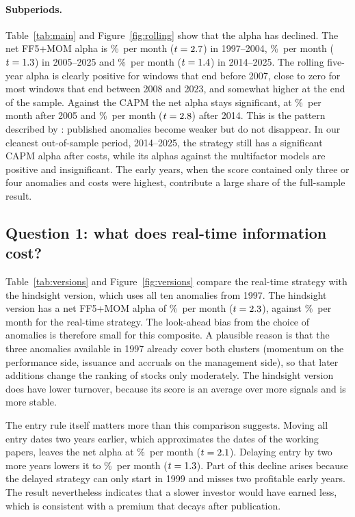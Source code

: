 \documentclass[12pt,a4paper]{article}
\newcommand{\pmo}{\%~per month}
\begin{document}
\paragraph{Subperiods.} Table~\ref{tab:main} and Figure~\ref{fig:rolling} show that the alpha has declined. The net FF5+MOM alpha is \netearlya\pmo{} ($t=2.7$) in 1997--2004, \netlatea\pmo{} ($t=1.3$) in 2005--2025 and \netrecenta\pmo{} ($t=1.4$) in 2014--2025. The rolling five-year alpha is clearly positive for windows that end before 2007, close to zero for most windows that end between 2008 and 2023, and somewhat higher at the end of the sample. Against the CAPM the net alpha stays significant, at \netlatecapm\pmo{} after 2005 and \netrecentcapm\pmo{} ($t=2.8$) after 2014. This is the pattern described by \citet{mclean2016}: published anomalies become weaker but do not disappear. In our cleanest out-of-sample period, 2014--2025, the strategy still has a significant CAPM alpha after costs, while its alphas against the multifactor models are positive and insignificant. The early years, when the score contained only three or four anomalies and costs were highest, contribute a large share of the full-sample result.

\subsection{Question 1: what does real-time information cost?}\label{sec:idea1}
Table~\ref{tab:versions} and Figure~\ref{fig:versions} compare the real-time strategy with the hindsight version, which uses all ten anomalies from 1997. The hindsight version has a net FF5+MOM alpha of \hindnet\pmo{} ($t=2.3$), against \netfulla\pmo{} for the real-time strategy. The look-ahead bias from the choice of anomalies is therefore small for this composite. A plausible reason is that the three anomalies available in 1997 already cover both clusters (momentum on the performance side, issuance and accruals on the management side), so that later additions change the ranking of stocks only moderately. The hindsight version does have lower turnover, because its score is an average over more signals and is more stable.

The entry rule itself matters more than this comparison suggests. Moving all entry dates two years earlier, which approximates the dates of the working papers, leaves the net alpha at \robearly\pmo{} ($t=2.1$). Delaying entry by two more years lowers it to \roblate\pmo{} ($t=1.3$). Part of this decline arises because the delayed strategy can only start in 1999 and misses two profitable early years. The result nevertheless indicates that a slower investor would have earned less, which is consistent with a premium that decays after publication.
\end{document}
